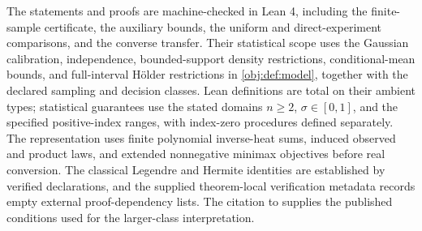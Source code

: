 The statements and proofs are machine-checked in Lean 4, including the finite-sample certificate, the auxiliary bounds, the uniform and direct-experiment comparisons, and the converse transfer. Their statistical scope uses the Gaussian calibration, independence, bounded-support density restrictions, conditional-mean bounds, and full-interval Hölder restrictions in \cref{obj:def:model}, together with the declared sampling and decision classes. Lean definitions are total on their ambient types; statistical guarantees use the stated domains \(n\ge2\), \(\sigma\in[0,1]\), and the specified positive-index ranges, with index-zero procedures defined separately. The representation uses finite polynomial inverse-heat sums, induced observed and product laws, and extended nonnegative minimax objectives before real conversion. The classical Legendre and Hermite identities are established by verified declarations, and the supplied theorem-local verification metadata records empty external proof-dependency lists. The citation to \citet[Assumptions~1Y, 2C, and 7]{PeiShen2017DevilTails} supplies the published conditions used for the larger-class interpretation.
